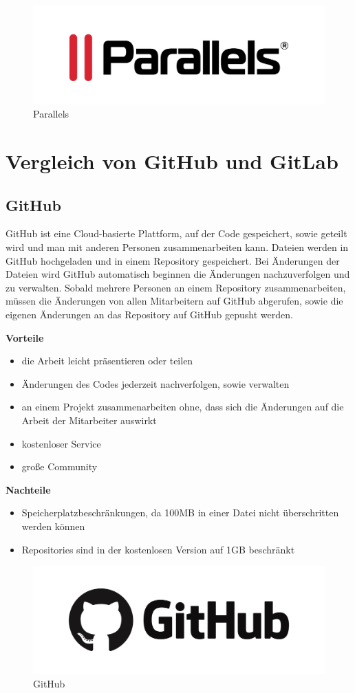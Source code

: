 \begin{figure}[H]
	\centering
	\includegraphics[width=0.5\linewidth]{images/Parallels.jpg}
	\caption[Parallels]{Parallels}
	\label{fig:Parallels}
\end{figure}

\section{Vergleich von GitHub und GitLab}
\subsection{GitHub}
GitHub ist eine Cloud-basierte Plattform, auf der Code gespeichert, sowie geteilt wird und man mit anderen Personen zusammenarbeiten kann. Dateien werden in GitHub hochgeladen und in einem Repository gespeichert. Bei Änderungen der Dateien wird GitHub automatisch beginnen die Änderungen nachzuverfolgen und zu verwalten. Sobald mehrere Personen an einem Repository zusammenarbeiten, müssen die Änderungen von allen Mitarbeitern auf GitHub abgerufen, sowie die eigenen Änderungen an das Repository auf GitHub gepusht werden. \textcite{GitHubUndGit}

\textbf{Vorteile}
\begin{itemize}
	\item die Arbeit leicht präsentieren oder teilen
	\item Änderungen des Codes jederzeit nachverfolgen, sowie verwalten
	\item an einem Projekt zusammenarbeiten ohne, dass sich die Änderungen auf die Arbeit der Mitarbeiter auswirkt
	\item kostenloser Service
	\item große Community
\end{itemize}

\textbf{Nachteile}
\begin{itemize}
	\item Speicherplatzbeschränkungen, da 100MB in einer Datei nicht überschritten werden können
	\item Repositories sind in der kostenlosen Version auf 1GB beschränkt
\end{itemize}


  \begin{figure}[H]
	\centering
	\includegraphics[width=0.5\linewidth]{images/GitHub.png}
	\caption[GitHub]{GitHub}
	\label{fig:GitHub}
\end{figure}

